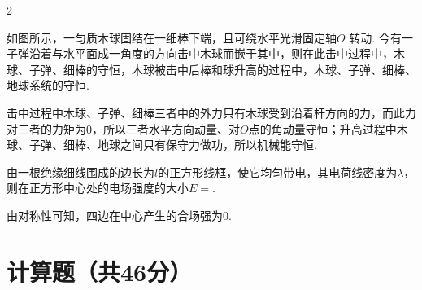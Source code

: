 \begin{paracol}{2}
\begin{problem}
    如图所示，一匀质木球固结在一细棒下端，且可绕水平光滑固定轴$O$
    转动. 今有一子弹沿着与水平面成一角度的方向击中木球而嵌于其中，则在此击中过程中，木球、子弹、细棒的守恒，木球被击中后棒和球升高的过程中，木球、子弹、细棒、地球系统的守恒.
    \switchcolumn\centering
\end{problem}
\end{paracol}
\begin{solution}
    击中过程中木球、子弹、细棒三者中的外力只有木球受到沿着杆方向的力，而此力对三者的力矩为$0$，所以三者水平方向动量、对$O$点的角动量守恒；升高过程中木球、子弹、细棒、地球之间只有保守力做功，所以机械能守恒.
\end{solution}

\begin{problem}
    由一根绝缘细线围成的边长为$l$的正方形线框，使它均匀带电，其电荷线密度为$\lambda$，则在正方形中心处的电场强度的大小$E=$.
\end{problem}
\begin{solution}
    由对称性可知，四边在中心产生的合场强为$0$.
\end{solution}

\section{计算题（共46分）}

